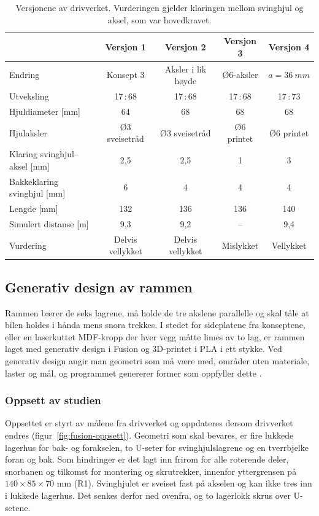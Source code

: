 \begin{table}[H]
    \centering
    \caption[Versjonene av drivverket]{Versjonene av drivverket. Vurderingen gjelder klaringen mellom svinghjul og aksel, som var hovedkravet.}
    \label{tab:dv-samlet}
    \small
    \renewcommand{\arraystretch}{1.2}
    \begin{tabular}{|l|c|c|c|c|}
        \hline
        & \textbf{Versjon 1} & \textbf{Versjon 2} & \textbf{Versjon 3} & \textbf{Versjon 4} \\
        \hline
        Endring & Konsept 3 & Aksler i lik høyde & Ø6-aksler & $a = \SI{36}{mm}$ \\
        Utveksling & 17\,:\,68 & 17\,:\,68 & 17\,:\,68 & 17\,:\,73 \\
        Hjuldiameter [mm] & 64 & 68 & 68 & 68 \\
        Hjulaksler & Ø3 sveisetråd & Ø3 sveisetråd & Ø6 printet & Ø6 printet \\
        Klaring svinghjul--aksel [mm] & 2,5 & 2,5 & 1 & 3 \\
        Bakkeklaring svinghjul [mm] & 6 & 4 & 4 & 4 \\
        Lengde [mm] & 132 & 136 & 136 & 140 \\
        Simulert distanse [m] & 9,3 & 9,2 & -- & 9,4 \\
        \hline
        Vurdering & Delvis vellykket & Delvis vellykket & Mislykket & Vellykket \\
        \hline
    \end{tabular}
\end{table}

\subsection{Generativ design av rammen}
\label{sec:gd-ramme}
Rammen bærer de seks lagrene, må holde de tre akslene parallelle og skal tåle at bilen holdes i hånda mens snora trekkes. I stedet for sideplatene fra konseptene, eller en laserkuttet MDF-kropp der hver vegg måtte limes av to lag, er rammen laget med generativ design i Fusion og 3D-printet i PLA i ett stykke. Ved generativ design angir man geometri som må være med, områder uten materiale, laster og mål, og programmet genererer former som oppfyller dette \parencite{autodesk_gd}.

\subsubsection{Oppsett av studien}
Oppsettet er styrt av målene fra drivverket og oppdateres dersom drivverket endres (figur~\ref{fig:fusion-oppsett}). Geometri som skal bevares, er fire lukkede lagerhus for bak- og forakselen, to U-seter for svinghjulslagrene og en tverrbjelke foran og bak. Som hindringer er det lagt inn frirom for alle roterende deler, snorbanen og tilkomst for montering og skrutrekker, innenfor yttergrensen på $140 \times 85 \times 70$ mm (R1). Svinghjulet er sveiset fast på akselen og kan ikke tres inn i lukkede lagerhus. Det senkes derfor ned ovenfra, og to lagerlokk skrus over U-setene.

